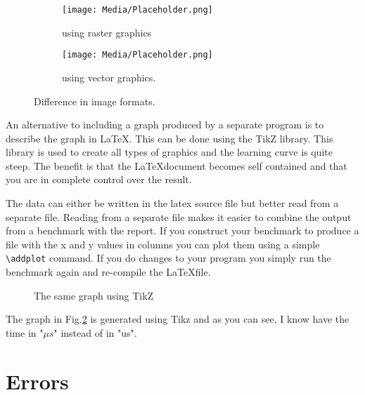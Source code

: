 \documentclass[a4paper,11pt]{article}
\begin{document}
\begin{figure}[h]
  \centering
  \begin{subfigure}{.5\textwidth}
    \centering
    \texttt{[image: Media/Placeholder.png]}
    \caption{using raster graphics}
  \end{subfigure}%
  \begin{subfigure}{.5\textwidth}
    \centering
    \texttt{[image: Media/Placeholder.png]}
    \caption{using vector graphics.}
  \end{subfigure}
  \caption{Difference in image formats.}
  \label{fig:images}
\end{figure}

An alternative to including a graph produced by a separate program is
to describe the graph in \LaTeX. This can be done using the TikZ
library. This library is used to create all types of graphics and the
learning curve is quite steep. The benefit is that the \LaTeX document
becomes self contained and that you are in complete control over the result.

The data can either be written in the latex source file but better read
from a separate file. Reading from a separate file makes it easier to
combine the output from a benchmark with the report. If you construct
your benchmark to produce a file with the x and y values in columns
you can plot them using a simple {\tt \textbackslash addplot}
command. If you do changes to your program you simply run the
benchmark again and re-compile the \LaTeX file.

\begin{figure}
  \centering
  \caption{The same graph using TikZ}
  \label{fig:tikz}
\end{figure}

The graph in Fig.\ref{fig:tikz} is generated using Tikz and as you can
see, I know have the time in "$\mu s$" instead of in "us".

\section*{Errors}
\end{document}
